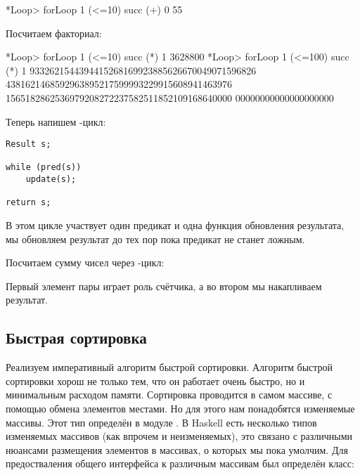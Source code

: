\begin{code}
*Loop> forLoop 1 (<=10) succ (+) 0
55
\end{code}

Посчитаем факториал:

\begin{code}
*Loop> forLoop 1 (<=10) succ (*) 1
3628800
*Loop> forLoop 1 (<=100) succ (*) 1
9332621544394415268169923885626670049071596826
4381621468592963895217599993229915608941463976
1565182862536979208272237582511852109168640000
00000000000000000000
\end{code}

Теперь напишем -цикл:

\begin{verbatim}
Result s;

while (pred(s))
    update(s);

return s;
\end{verbatim}

В этом цикле участвует один предикат и одна функция обновления
результата, мы обновляем результат до тех пор пока предикат
не станет ложным.


Посчитаем сумму чисел через -цикл:


Первый элемент пары играет роль счётчика, а во 
втором мы накапливаем результат.

\subsection{Быстрая сортировка}

Реализуем императивный алгоритм быстрой сортировки.
Алгоритм быстрой сортировки хорош не только тем, что
он работает очень быстро, но и минимальным расходом памяти.
Сортировка проводится в самом массиве, с помощью 
обмена элементов местами. Но для этого нам понадобятся 
изменяемые массивы. Этот тип определён в модуле
. В Haskell есть несколько типов
изменяемых массивов (как впрочем и неизменяемых),
это связано с различными нюансами размещения элементов
в массивах, о которых мы пока умолчим. Для предостваления
общего интерфейса к различным массивам был определён класс:


